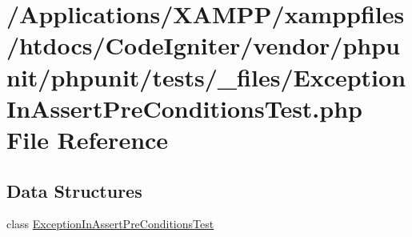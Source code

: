 \hypertarget{_exception_in_assert_pre_conditions_test_8php}{}\section{/\+Applications/\+X\+A\+M\+P\+P/xamppfiles/htdocs/\+Code\+Igniter/vendor/phpunit/phpunit/tests/\+\_\+files/\+Exception\+In\+Assert\+Pre\+Conditions\+Test.php File Reference}
\label{_exception_in_assert_pre_conditions_test_8php}
\subsection*{Data Structures}
\begin{DoxyCompactItemize}
\item 
class \mbox{\hyperlink{class_exception_in_assert_pre_conditions_test}{Exception\+In\+Assert\+Pre\+Conditions\+Test}}
\end{DoxyCompactItemize}
